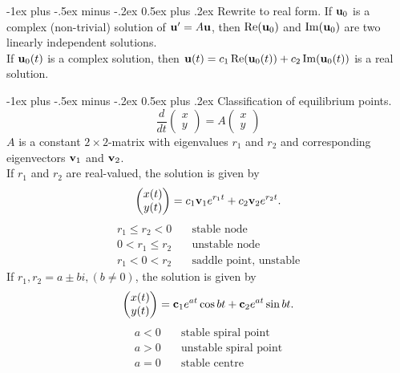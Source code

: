 \documentclass[10pt,landscape,a4paper]{article}
\makeatletter
\renewcommand{\section}{\@startsection{section}{1}{0mm}%
	{-1ex plus -.5ex minus -.2ex}%
	{0.5ex plus .2ex}%
	{\normalfont\large\bfseries}}
\makeatother
\begin{document}
\begin{multicols}{3}
	\section{Rewrite to real form.}
	If $ \vb{u}_0 $ is a complex (non-trivial) solution of $ \vb{u}' = A\vb{u} $, then $ \Re(\vb{u}_0) $ and $ \Im(\vb{u}_0) $ are two linearly independent solutions.\\
	If $ \vb{u}_0(t) $ is a complex solution, then $ \vb{u}(t) = c_1 \Re(\vb{u}_0(t)) + c_2 \Im(\vb{u}_0(t)) $ is a real solution.
	
	\section{Classification of equilibrium points.}
	\[
		\frac{d}{dt} \begin{pmatrix}x\\y\end{pmatrix} = A \begin{pmatrix}x\\y\end{pmatrix}
	\]
	$ A $ is a constant $ 2 \times 2 $-matrix with eigenvalues $ r_1 $ and $ r_2 $ and corresponding eigenvectors $ \vb{v}_1 $ and $ \vb{v}_2 $.\\
	If $ r_1 $ and $ r_2 $ are real-valued, the solution is given by
	\[
		\begin{pmatrix}x(t)\\y(t)\end{pmatrix} = c_1 \vb{v}_1 e^{r_1 t} + c_2 \vb{v}_2 e^{r_2 t}.
	\]
	\begin{align*}
		r_1 \leq r_2 < 0 & \quad \text{stable node}            \\
		0 < r_1 \leq r_2 & \quad \text{unstable node}          \\
		r_1 < 0 < r_2    & \quad \text{saddle point, unstable}
	\end{align*}
	If $ r_1, r_2 = a \pm bi, (b \neq 0) $, the solution is given by
	\[
		\begin{pmatrix}x(t)\\y(t)\end{pmatrix} = \vb{c}_1 e^{at} \cos{bt} + \vb{c}_2 e^{at} \sin{bt}.
	\]
	\begin{align*}
		a < 0 & \quad \text{stable spiral point}   \\
		a > 0 & \quad \text{unstable spiral point} \\
		a = 0 & \quad \text{stable centre}
	\end{align*}
	

\end{multicols}
\end{document}
